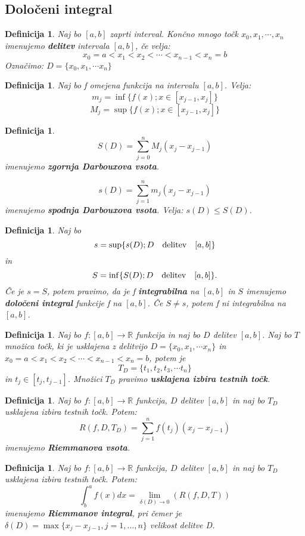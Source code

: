 \documentclass[11pt]{article}
\newtheorem{Definicija}[Izrek]{{\sc Definicija}}
\begin{document}
\subsection{Določeni integral}
\begin{Definicija}
	Naj bo $[a,b]$ zaprti interval. Končno mnogo točk $x_0, x_1,\cdots , x_n$ imenujemo \textbf{delitev} intervala $[a,b]$, če velja:
	$$x_0 = a < x_1 < x_2 < \cdots < x_{n-1} < x_n = b$$
	Označimo: $D = \{x_0, x_1, \cdots x_n\}$
\end{Definicija}
\begin{Definicija}
	Naj bo f omejena funkcija na intervalu $[a,b]$. Velja:
	$$m_j = \inf \{f(x); x\in [x_{j-1},x_j]\}$$
	$$M_j = \sup \{f(x); x\in [x_{j-1},x_j]\}$$
\end{Definicija}
\begin{Definicija}
	$$S(D) =  \sum_{j= 0}^{n}{M_j(x_j - x_{j-1})}$$
	imenujemo \textbf{zgornja Darbouxova vsota}.
	
	$$s(D) = \sum_{j =1}^{n}{m_j(x_j -x_{j-1})}$$
	imenujemo \textbf{spodnja Darbouxova vsota}.
	\newline
	Velja: $s(D) \le S(D)$.
\end{Definicija}
\begin{Definicija}
	Naj bo $$s = \sup \{s(D); D \quad \textnormal{delitev} \quad [a,b]\}$$ in \newline $$S = \inf  \{S(D); D \quad \textnormal{delitev} \quad [a,b]\}.$$ Če je $ s = S$, potem pravimo, da je f \textbf{integrabilna} na $[a,b]$ in $S$ imenujemo \textbf{določeni integral} funkcije f na $[a,b]$.
	\newline
	Če $ S\ne s$, potem f ni integrabilna na $[a,b]$.
\end{Definicija}
\begin{Definicija}
	Naj bo $f:[a,b] \to \mathbb{R}$ funkcija in naj bo $D$ delitev $[a,b]$. Naj bo $T$ množica točk, ki je usklajena z delitvijo $D = \{x_0, x_1, \cdots x_n\}$ in $x_0 = a < x_1 < x_2 < \cdots < x_{n-1} < x_n = b$, potem je $$T_D = \{t_1, t_2, t_3,\cdots t_n\}$$ in $t_j \in [t_j,t_{j-1}]$. Množici $T_D$ pravimo \textbf{usklajena izbira testnih točk}.
\end{Definicija}
\begin{Definicija}
	Naj bo  $f:[a,b] \to \mathbb{R}$ funkcija, $D$ delitev $[a,b]$ in naj bo $T_D$ usklajena izbira testnih točk. Potem:
	$$R(f,D,T_D) = \sum_{j = 1}^{n}{f(t_j)(x_j - x_{j-1})}$$
	imenujemo \textbf{Riemmanova vsota}.
\end{Definicija}
\begin{Definicija}
	Naj bo  $f:[a,b] \to \mathbb{R}$ funkcija, $D$ delitev $[a,b]$ in naj bo $T_D$ usklajena izbira testnih točk. Potem:
	$$\int_{b}^{a}{f(x) dx} = \lim\limits_{\delta(D) \to 0}{(R(f,D,T))}$$ imenujemo \textbf{Riemmanov integral}, pri čemer je $\delta(D) = \max\{x_j - x_{j-1} , j = 1, \dots ,n\}$ velikost delitve D.
\end{Definicija}
\end{document}
